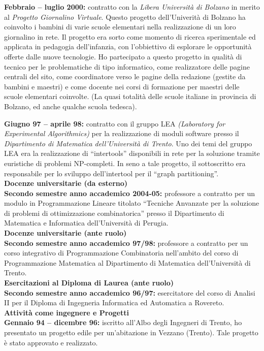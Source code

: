 \documentclass[10pt]{article}
\newcommand{\subvoice}[1] { {\large \bf #1} \smallskip\\ }
\begin{document}
\noindent
{\bf Febbraio -- luglio 2000:}
contratto con la {\em Libera Universit\`a di Bolzano}
in merito al {\em Progetto Giornalino Virtuale}.
Questo progetto dell'Univerit\`a di Bolzano
ha coinvolto i bambini di varie scuole elementari
nella realizzazione di un loro giornalino in rete.
Il progetto era sorto
come momento di ricerca sperimentale ed applicata
in pedagogia dell'infanzia, con l'obbiettivo
di esplorare le opportunit\`a offerte dalle nuove tecnologie. 
Ho partecipato a questo progetto
in qualit\`a di tecnico
per le problematiche di tipo informatico,
come realizzatore delle pagine centrali del sito,
come coordinatore verso le pagine della redazione (gestite da bambini
e maestri) e come docente nei corsi di formazione per
maestri delle scuole elementari coinvolte.
(La quasi totalit\`a delle scuole italiane in provincia di Bolzano,
ed anche qualche scuola tedesca).

\noindent
{\bf Giugno 97 -- aprile 98:}
contratto con il gruppo LEA {\em (Laboratory for Experimental Algorithmics)}
per la realizzazione di moduli software
presso il {\em Dipartimento di Matematica dell'Universit\`a di Trento}.
Uno dei temi del gruppo LEA
era la realizzazione di ``intertools''
disponibili in rete per la soluzione tramite euristiche
di problemi NP-completi.
In seno a tale progetto,
il sottoscritto era responsabile per lo sviluppo dell'intertool
per il ``graph partitioning''.\\

\subvoice{Docenze universitarie (da esterno)}
{\bf Secondo semestre anno accademico 2004-05:}
professore a contratto per un modulo in Programmazione Lineare
titolato ``Tecniche Anvanzate per la soluzione di problemi di ottimizzazione
combinatorica''
presso il Dipartimento di Matematica e Informatica
dell'Universit\`a di Perugia.\\

\subvoice{Docenze universitarie (ante ruolo)}
{\bf Secondo semestre anno accademico 97/98:}
professore a contratto per 
un corso integrativo di Programmazione Combinatoria
nell'ambito del corso di Programmazione Matematica
al Dipartimento di Matematica dell'Universit\`a di Trento.\\

\subvoice{Esercitazioni al Diploma di Laurea (ante ruolo)}
{\bf Secondo semestre anno accademico 96/97:}
esercitatore del corso di Analisi II
per il Diploma di Ingegneria Informatica ed Automatica a Rovereto.\\

\subvoice{Attivit\`a come ingegnere e Progetti}
{\bf Gennaio 94 -- dicembre 96:}
iscritto all'Albo degli Ingegneri di Trento,
ho presentato un progetto edile
per un'abitazione in Vezzano (Trento).
Tale progetto \`e stato approvato e realizzato.\\
\end{document}
